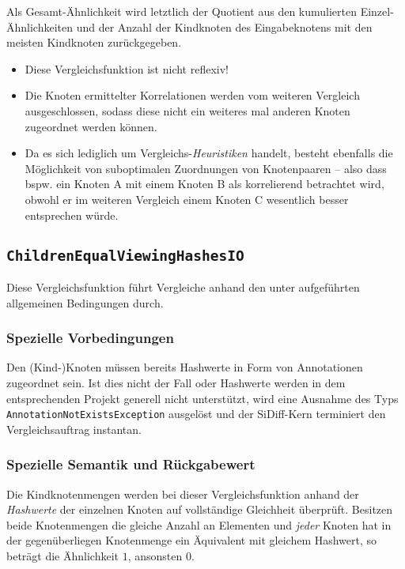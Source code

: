 Als Gesamt-Ähnlichkeit wird letztlich der Quotient aus den kumulierten Einzel-Ähnlichkeiten und der Anzahl der Kindknoten des Eingabeknotens mit den meisten Kindknoten zurückgegeben.

\begin{itemize}
	\item Diese Vergleichsfunktion ist nicht reflexiv!
	\item Die Knoten ermittelter Korrelationen werden vom weiteren Vergleich ausgeschlossen, sodass diese nicht ein weiteres mal anderen Knoten zugeordnet werden können.
	\item Da es sich lediglich um Vergleichs-\emph{Heuristiken} handelt, besteht ebenfalls die Möglichkeit von suboptimalen Zuordnungen von Knotenpaaren -- also dass bspw. ein Knoten A mit einem Knoten B als korrelierend betrachtet wird, obwohl er im weiteren Vergleich einem Knoten C wesentlich besser entsprechen würde.
\end{itemize}


%
%
\subsection{\texttt{ChildrenEqualViewingHashesIO}}
Diese Vergleichsfunktion führt Vergleiche anhand den unter  aufgeführten allgemeinen Bedingungen durch.

\subsubsection*{Spezielle Vorbedingungen}
Den (Kind-)Knoten müssen bereits Hashwerte in Form von Annotationen zugeordnet sein. Ist dies nicht der Fall oder Hashwerte werden in dem entsprechenden Projekt generell nicht unterstützt, wird eine Ausnahme des Typs \texttt{AnnotationNotExistsException} ausgelöst und der SiDiff-Kern terminiert den Vergleichsauftrag instantan.

\subsubsection*{Spezielle Semantik und Rückgabewert}
Die Kindknotenmengen werden bei dieser Vergleichsfunktion anhand der \emph{Hashwerte} der einzelnen Knoten auf vollständige Gleichheit überprüft. Besitzen beide Knotenmengen die gleiche Anzahl an Elementen und \emph{jeder} Knoten hat in der gegenüberliegen Knotenmenge ein Äquivalent mit gleichem Hashwert, so beträgt die Ähnlichkeit $1$, ansonsten $0$.


